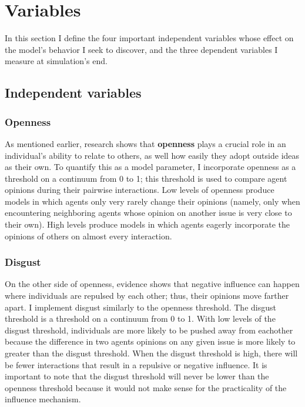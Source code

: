 
\section{Variables}

In this section I define the four important independent variables whose effect
on the model's behavior I seek to discover, and the three dependent variables I
measure at simulation's end.

\subsection{Independent variables}

\subsubsection{Openness}

As mentioned earlier, research shows that \textbf{openness} plays a crucial role in an
individual's ability to relate to others, as well how easily they adopt outside
ideas as their own. To quantify this as a model parameter, I incorporate
openness as a threshold on a continuum from 0 to 1; this threshold is used to
compare agent opinions during their pairwise interactions. Low levels of
openness produce models in which agents only very rarely change their opinions
(namely, only when encountering neighboring agents whose opinion on another
issue is very close to their own). High levels produce models in which agents
eagerly incorporate the opinions of others on almost every interaction.

\subsubsection{Disgust}

On the other side of openness, evidence shows that negative influence can happen where individuals are repulsed by each other; thus, their opinions move farther apart. I implement disgust similarly to the openness threshold. The disgust threshold is a threshold on a continuum from 0 to 1. With low levels of the disgust threshold, individuals are more likely to be pushed away from eachother because the difference in two agents opinions on any given issue is more likely to greater than the disgust threshold. When the disgust threshold is high, there will be fewer interactions that result in a repulsive or negative influence. It is important to note that the disgust threshold will never be lower than the openness threshold because it would not make sense for the practicality of the influence mechanism.   

